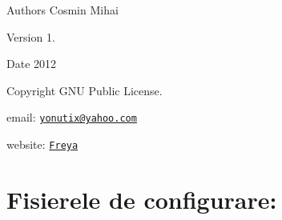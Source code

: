  \begin{DoxyAuthor}{Authors}
Cosmin Mihai 
\end{DoxyAuthor}
\begin{DoxyVersion}{Version}
1.\par
\par
 
\end{DoxyVersion}
\begin{DoxyDate}{Date}
2012 
\end{DoxyDate}
\begin{DoxyCopyright}{Copyright}
G\-N\-U Public License.
\end{DoxyCopyright}

\begin{DoxyItemize}
\item email\-: \href{mailto:yonutix@yahoo.com}{\tt yonutix@yahoo.\-com}\par

\item website\-: \href{http://www.freya.zzl.org}{\tt Freya}
\end{DoxyItemize}

\section*{Fisierele de configurare\-:}

